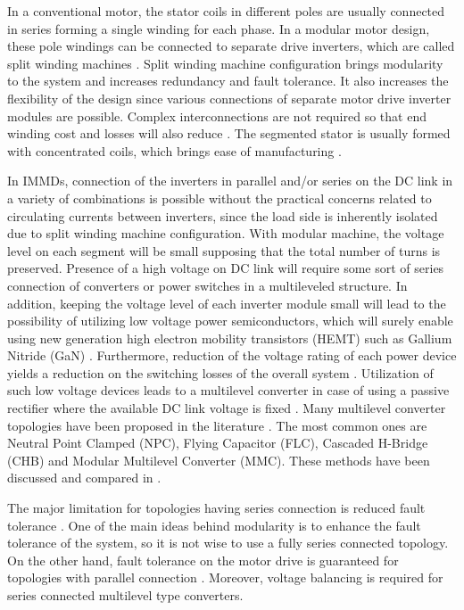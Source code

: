 \documentclass[conference,a4paper,twocolumn]{IEEEtran}
\begin{document}
In a conventional motor, the stator coils in different poles are usually connected in series forming a single winding for each phase. In a modular motor design, these pole windings can be connected to separate drive inverters, which are called split winding machines \cite{Galassini2015,Wang2013,Wang2015}. Split winding machine configuration brings modularity to the system and increases redundancy and fault tolerance. It also increases the flexibility of the design since various connections of separate motor drive inverter modules are possible. Complex interconnections are not required so that end winding cost and losses will also reduce \cite{Wang2015}. The segmented stator is usually formed with concentrated coils, which brings ease of manufacturing \cite{Lambert2015a}.

In IMMDs, connection of the inverters in parallel and/or series on the DC link in a variety of combinations is possible without the practical concerns related to circulating currents between inverters, since the load side is inherently isolated due to split winding machine configuration. With modular machine, the voltage level on each segment will be small supposing that the total number of turns is preserved. Presence of a high voltage on DC link will require some sort of series connection of converters or power switches in a multileveled structure. In addition, keeping the voltage level of each inverter module small will lead to the possibility of utilizing low voltage power semiconductors, which will surely enable using new generation high electron mobility transistors (HEMT) such as Gallium Nitride (GaN) \cite{Wang2015}. Furthermore, reduction of the voltage rating of each power device yields a reduction on the switching losses of the overall system \cite{LoCalzo2016}. Utilization of such low voltage devices leads to a multilevel converter in case of using a passive rectifier where the available DC link voltage is fixed \cite{Wang2013}. Many multilevel converter topologies have been proposed in the literature \cite{Wang2014}. The most common ones are Neutral Point Clamped (NPC), Flying Capacitor (FLC), Cascaded H-Bridge (CHB) and Modular Multilevel Converter (MMC). These methods have been discussed and compared in \cite{LoCalzo2016,Wang2014,Wang2015}.

The major limitation for topologies having series connection is reduced fault tolerance \cite{Galassini2015}. One of the main ideas behind modularity is to enhance the fault tolerance of the system, so it is not wise to use a fully series connected topology. On the other hand, fault tolerance on the motor drive is guaranteed for topologies with parallel connection \cite{Galassini2015}. Moreover, voltage balancing is required for series connected multilevel type converters.
\end{document}

